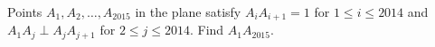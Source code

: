 Points $A_1,A_2,\dots,A_{2015}$ in the plane satisfy $A_iA_{i+1}=1$ for $1\le i\le2014$ and $A_1A_j\perp A_jA_{j+1}$ for $2\le j\le2014$. Find $A_1A_{2015}$.
